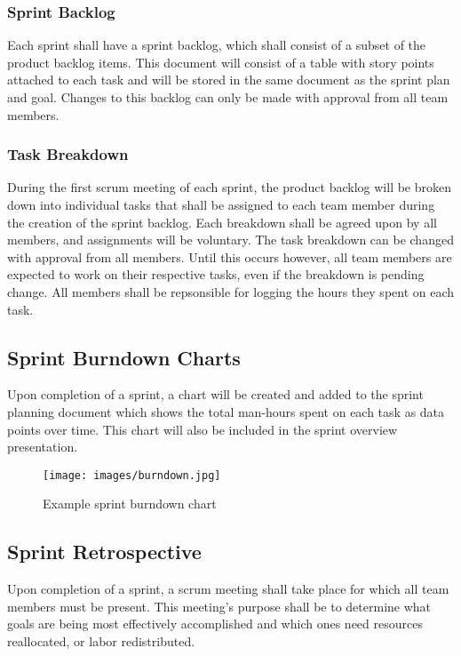 \subsubsection{Sprint Backlog}
Each sprint shall have a sprint backlog, which shall consist of a subset of the product backlog items. This document will consist of a table with story points attached to each task and will be stored in the same document as the sprint plan and goal. Changes to this backlog can only be made with approval from all team members.

\subsubsection{Task Breakdown}
During the first scrum meeting of each sprint, the product backlog will be broken down into individual tasks that shall be assigned to each team member during the creation of the sprint backlog. Each breakdown shall be agreed upon by all members, and assignments will be voluntary. The task breakdown can be changed with approval from all members. Until this occurs however, all team members are expected to work on their respective tasks, even if the breakdown is pending change. All members shall be repsonsible for logging the hours they spent on each task.

\subsection{Sprint Burndown Charts}
Upon completion of a sprint, a chart will be created and added to the sprint planning document which shows the total man-hours spent on each task as data points over time. This chart will also be included in the sprint overview presentation.

\begin{figure}[h!]
    \centering
    \texttt{[image: images/burndown.jpg]}
    \caption{Example sprint burndown chart}
\end{figure}

\subsection{Sprint Retrospective}
Upon completion of a sprint, a scrum meeting shall take place for which all team members must be present. This meeting's purpose shall be to determine what goals are being most effectively accomplished and which ones need resources reallocated, or labor redistributed.

